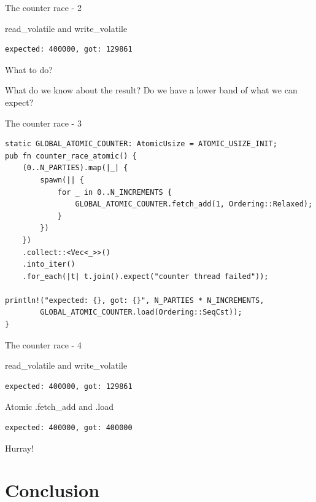 \documentclass[10pt,aspectratio=169]{beamer}
\begin{document}
\begin{frame}[fragile]{The counter race - 2}

      \begin{alertblock}{read\_volatile and write\_volatile}
\begin{verbatim}
expected: 400000, got: 129861
\end{verbatim}
      \end{alertblock}

    What to do?

    What do we know about the result?
    Do we have a lower band of what we can expect?
\end{frame}


\begin{frame}[fragile]{The counter race - 3}
\begin{verbatim}
static GLOBAL_ATOMIC_COUNTER: AtomicUsize = ATOMIC_USIZE_INIT;
pub fn counter_race_atomic() {
    (0..N_PARTIES).map(|_| {
        spawn(|| {
            for _ in 0..N_INCREMENTS {
                GLOBAL_ATOMIC_COUNTER.fetch_add(1, Ordering::Relaxed);
            }
        })
    })
    .collect::<Vec<_>>()
    .into_iter()
    .for_each(|t| t.join().expect("counter thread failed"));

println!("expected: {}, got: {}", N_PARTIES * N_INCREMENTS,
        GLOBAL_ATOMIC_COUNTER.load(Ordering::SeqCst));
}
\end{verbatim}
\end{frame}


\begin{frame}[fragile]{The counter race - 4}

      \begin{block}{read\_volatile and write\_volatile}
\begin{verbatim}
expected: 400000, got: 129861
\end{verbatim}
      \end{block}

      \begin{alertblock}{Atomic .fetch\_add and .load}
\begin{verbatim}
expected: 400000, got: 400000
\end{verbatim}
      \end{alertblock}

    Hurray!
\end{frame}


\section{Conclusion}
\end{document}
